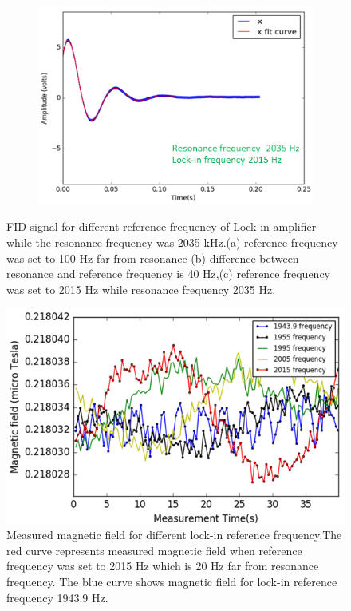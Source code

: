 \begin{figure}
\begin{subfigure}[b]{0.4\textwidth}
        \includegraphics[width=\textwidth]{figures/reference_frequency2}
        \caption{}
        \label{fig:five over x}
    \end{subfigure}
    \caption{FID signal for different reference frequency of Lock-in amplifier while the resonance frequency was 2035 kHz.(a) reference frequency was set to 100 Hz far from resonance (b) difference between resonance and reference frequency is 40 Hz,(c) reference frequency was set to 2015 Hz while resonance frequency 2035 Hz. }
\end{figure}
\begin{figure}[h]
\centering\includegraphics[width=0.8\linewidth]{figures/reference_frequency}
\caption{Measured magnetic field for different lock-in reference frequency.The red curve represents measured magnetic field when reference frequency was set to 2015 Hz which is 20 Hz far from resonance frequency. The blue curve shows magnetic field for lock-in reference frequency 1943.9 Hz.}
\end{figure}
